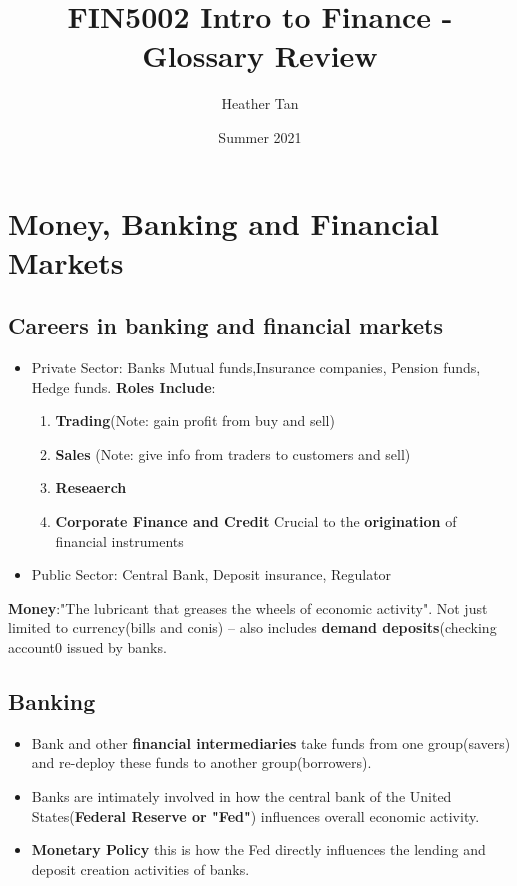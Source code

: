 \documentclass{article}
\title{FIN5002 Intro to Finance - Glossary Review}
\author{Heather Tan}
\date{Summer 2021}
\theoremstyle{definition}
\theoremstyle{thrm}
\theoremstyle{lma}
\theoremstyle{ppst}
\theoremstyle{crlr}
\begin{document}
\maketitle	
\tableofcontents
\pagebreak

\section{Money, Banking and Financial Markets}
\subsection{Careers in banking and financial markets}
\begin{itemize}
	\item Private Sector: Banks Mutual funds,Insurance companies, Pension funds, Hedge funds. \textbf{Roles Include}:
	\begin{enumerate}
		\item \textbf{Trading}(Note: gain profit from buy and sell)
		\item \textbf{Sales} (Note: give info from traders to customers and sell)
		\item \textbf{Reseaerch}
		\item \textbf{Corporate Finance and Credit} Crucial to the \textbf{origination} of financial instruments
	\end{enumerate}
	\item Public Sector: Central Bank, Deposit insurance, Regulator
\end{itemize}

\textbf{Money}:"The lubricant that greases the wheels of economic activity". Not just limited to currency(bills and conis) -- also includes \textbf{demand deposits}(checking account0 issued by banks.

\subsection{Banking}
\begin{itemize}
	\item Bank and other \textbf{financial intermediaries} take funds from one group(savers) and re-deploy these funds to another group(borrowers).
	\item Banks are intimately involved in how the central bank of the United States(\textbf{Federal Reserve or "Fed"}) influences overall economic activity.
	\item \textbf{Monetary Policy} this is how the Fed directly influences the lending and deposit creation activities of banks. 
\end{itemize}
\end{document}
